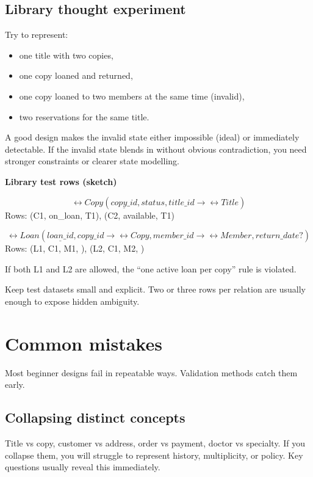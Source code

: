 \subsection{Library thought experiment}
Try to represent:
\begin{itemize}
  \item one title with two copies,
  \item one copy loaned and returned,
  \item one copy loaned to two members at the same time (invalid),
  \item two reservations for the same title.
\end{itemize}

A good design makes the invalid state either impossible (ideal) or immediately detectable.
If the invalid state blends in without obvious contradiction, you need stronger constraints or clearer state modelling.

\begin{examplebox}
\textbf{Library test rows (sketch)}\par\smallskip
\[
\rel{Copy}(\underline{copy\_id}, status, title\_id \rightarrow \rel{Title})
\]
Rows: (C1, on\_loan, T1), (C2, available, T1)\par
\[
\rel{Loan}(\underline{loan\_id}, copy\_id \rightarrow \rel{Copy}, member\_id \rightarrow \rel{Member}, return\_date?)
\]
Rows: (L1, C1, M1, ), (L2, C1, M2, )\par
If both L1 and L2 are allowed, the “one active loan per copy” rule is violated.
\end{examplebox}

\begin{notebox}
Keep test datasets small and explicit.
Two or three rows per relation are usually enough to expose hidden ambiguity.
\end{notebox}

\section{Common mistakes}
Most beginner designs fail in repeatable ways.
Validation methods catch them early.

\subsection{Collapsing distinct concepts}
Title vs copy, customer vs address, order vs payment, doctor vs specialty.
If you collapse them, you will struggle to represent history, multiplicity, or policy.
Key questions usually reveal this immediately.

